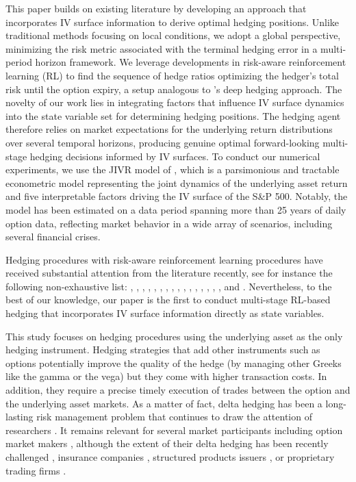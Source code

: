\documentclass[12pt]{article}
\begin{document}
This paper builds on existing literature by developing an approach that incorporates IV surface information to derive optimal hedging positions. Unlike traditional methods focusing on local conditions, we adopt a global perspective, minimizing the risk metric associated with the terminal hedging error in a multi-period horizon framework.
We leverage developments in risk-aware reinforcement learning (RL) to find the sequence of hedge ratios optimizing the hedger's total risk until the option expiry, a setup analogous to \cite{buehler2019deep}'s deep hedging approach. 
The novelty of our work lies in integrating factors that influence IV surface dynamics into the state variable set for determining hedging positions. The hedging agent therefore relies on market expectations for the underlying return distributions over several temporal horizons, producing genuine optimal forward-looking multi-stage hedging decisions informed by IV surfaces. To conduct our numerical experiments, we use the JIVR model of \cite{Frnacois2023}, which is a parsimonious and tractable econometric model representing the joint dynamics of the underlying asset return and five interpretable factors driving the IV surface of the S\&P 500. Notably, the model has been estimated on a data period spanning more than 25 years of daily option data, reflecting market behavior in a wide array of scenarios, including several financial crises.

Hedging procedures with risk-aware reinforcement learning procedures have received substantial attention from the literature recently, see for instance the following non-exhaustive list: \cite{halperin2019qlbs}, \cite{cao2020deep}, \cite{du2020deep}, \cite{carbonneau2021equal}, \cite{carbonneau2021deep}, \cite{giurca2021delta}, \cite{horvath2021deep}, \cite{imaki2021no}, \cite{lutkebohmert2022robust}, \cite{xu2022delta}, \cite{cao2023gamma}, \cite{carbonneau2023deep}, \cite{Marzaban_rl}, \cite{mikkila2023empirical}, \cite{pickard2023deep}, \cite{raj2023quantum}, \cite{wu2023robust} and \cite{neagu2024deep}. Nevertheless, to the best of our knowledge, our paper is the first to conduct multi-stage RL-based hedging that incorporates IV surface information directly as state variables.

This study focuses on hedging procedures using the underlying asset as the only hedging instrument. Hedging strategies that add other instruments such as options potentially improve the quality of the hedge (by managing other Greeks like the gamma or the vega) but they come with higher transaction costs. In addition, they require a precise timely execution of trades between the option and the underlying asset markets. As a matter of fact, delta hedging has been a long-lasting risk management problem that continues to draw the attention of researchers \citep{hull2017optimal}. It remains relevant for several market participants including option market makers \citep{huh2015options, kokholm2024model}, although the extent of their delta hedging has been recently challenged \citep{hu2023options}, insurance companies \citep{augustyniak2012out, sun2019benchmarked}, structured products issuers \citep{entrop2020hedging, henderson2020pre}, or proprietary trading firms \citep{ni2005stock, o2023retail}.
\end{document}
